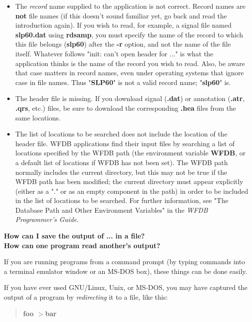 \documentclass[twoside]{book}
\begin{document}
\begin{itemize}
\item
The \textit{record} name supplied to the application is not correct.  Record
names are \textbf{not} file names (if this doesn't sound familiar yet, go back
and read the introduction again).  If you wish to read, for example, a signal
file named \textbf{slp60.dat} using \textbf{rdsamp}, you must specify the name
of the record to which this file belongs (\textbf{slp60}) after the \textbf{-r}
option, and not the name of the file itself.  Whatever follows "init: can't
open header for ..." is what the application thinks is the name of the record
you wish to read.  Also, be aware that case matters in record names, even under
operating systems that ignore case in file names.  Thus "\textbf{SLP60}" is not
a valid record name; "\textbf{slp60}" is.

\item
The header file is missing.  If you download signal (\textbf{.dat}) or
annotation (\textbf{.atr}, \textbf{.qrs}, etc.) files, be sure to download
the corresponding \textbf{.hea} files from the same locations.

\item
The list of locations to be searched does not include the location of
the header file.  WFDB applications find their input files by searching
a list of locations specified by the WFDB path (the environment variable
\textbf{WFDB}, or a default list of locations if WFDB has not been set). The
WFDB path normally includes the current directory, but this may not be
true if the WFDB path has been modified;  the current directory must
appear explicitly (either as a "." or as an empty component in the path)
in order to be included in the list of locations to be searched.  For
further information, see "The Database Path and Other Environment Variables"
in the \textit{WFDB Programmer's Guide}.
\end{itemize}

\vspace{5mm}
\noindent
{\large \textbf{How can I save the output of ... in a file?} \\
\textbf{How can one program read another's output?}}

\noindent
If you are running programs from a command prompt (by typing commands into a
terminal emulator window or an MS-DOS box), these things can be done easily.

If you have ever used GNU/Linux, Unix, or MS-DOS, you may have captured the
output of a program by \textit{redirecting} it to a file, like this:
\begin{quote}
\textbf{foo $>$bar}
\end{quote}
\end{document}
